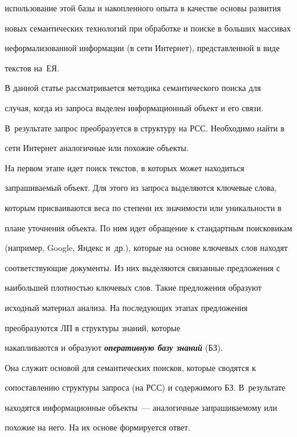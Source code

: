 использование этой базы и накопленного опыта в качестве основы развития 


новых семантических технологий при обработке и поиске в больших массивах 


неформализованной информации (в сети Интернет), представленной в виде 


текстов на~ЕЯ. 


    


    В данной статье рассматривается методика семантического поиска для 


случая, когда из запроса выделен информационный объект и его связи. 


В~результате запрос преобразуется в структуру на РСС. Необходимо найти в 


сети Интернет аналогичные или похожие объекты.


    


    На первом этапе идет поиск текстов, в которых может находиться 


запрашиваемый объект. Для этого из запроса выделяются ключевые слова, 


которым присваиваются веса по степени их значимости или уникальности в 


плане уточнения объекта. По ним идет обращение к стандартным поисковикам 


(например, Google, Яндекс и~др.), которые на основе ключевых слов находят 


соответствующие документы. Из них выделяются связанные предложения с 


наибольшей плотностью ключевых слов. Такие предложения образуют 


исходный материал анализа. На последующих этапах предложения 


преобразуются ЛП в структуры знаний, которые 


накапливаются и образуют {\bfseries\textit{оперативную базу знаний}} (БЗ). 


Она служит основой для семантических поисков, которые сводятся к 


сопоставлению структуры запроса (на РСС) и содержимого БЗ. В~результате 


находятся информационные объекты~--- аналогичные запрашиваемому или 


похожие на него. На их основе формируется ответ.


    


